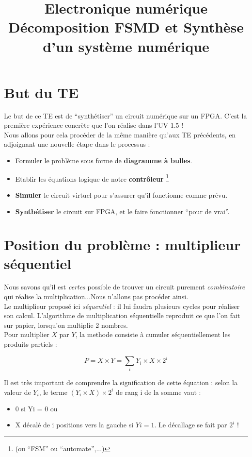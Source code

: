 \documentclass[a4paper,11pt]{article}
\title{{\Huge Electronique numérique}\\Décomposition FSMD et Synthèse d'un système numérique}
\date{}
\begin{document}
\maketitle

\section{But du TE}

Le but de ce TE est de ``synthétiser'' un circuit numérique sur un FPGA. C'est la première expérience concrète que l'on réalise dans l'UV 1.5 ! \\

Nous allons pour cela procéder de la même manière qu'aux TE précédents, en adjoignant une nouvelle étape dans le processus :

\begin{itemize}
\item Formuler le problème sous forme de {\bf diagramme à bulles}.
\item Etablir les équations logique de notre {\bf contrôleur} \footnote { (ou ``FSM'' ou ``automate'',...)}
\item {\bf Simuler} le circuit virtuel pour s'assurer qu'il fonctionne comme prévu.
\item {\bf Synthétiser} le circuit sur FPGA, et le faire fonctionner ``pour de vrai''.
\end{itemize}

\section{Position du problème : multiplieur séquentiel}

Nous savons qu'il est {\it certes} possible de trouver un circuit purement {\it combinatoire} qui réalise la multiplication...Nous n'allons pas procéder ainsi.\\

Le multiplieur  proposé ici {\it séquentiel} : il lui faudra plusieurs cycles pour réaliser son calcul. L'algorithme de multiplication séquentielle reproduit ce que l'on fait sur papier, lorsqu'on multiplie 2 nombres.\\

Pour multiplier $X$ par $Y$, la methode consiste à cumuler séquentiellement les produits partiels :

$$ P=X \times Y = \sum_{i}Y_i\times X \times 2^i$$

Il est très important de comprendre la signification de cette équation : selon la valeur de $Y_i$, le terme $ (Y_i \times X) \times  2^i $ de rang i de la somme vaut :
\begin{itemize}
\item 0 si Yi = 0 ou
\item X décalé de i positions vers la gauche si $Yi = 1$. Le décallage se fait par $2^i$ !
\end{itemize}
\end{document}
